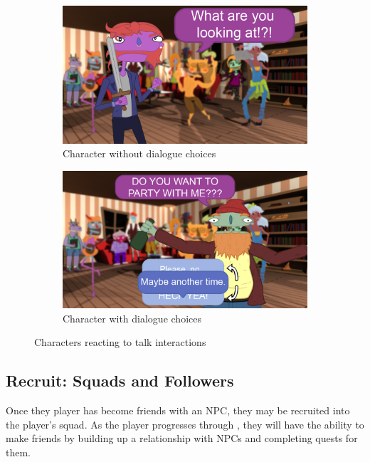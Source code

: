 \begin{figure}[H]
  \centering\begin{subfigure}{.45\textwidth}
    \centering
    \includegraphics[width=.9\linewidth]{images/UI_npc_nodialogue}
    \caption{Character without dialogue choices}
	\label{fig:speech_bubble}
  \end{subfigure}%
  \begin{subfigure}{.45\textwidth}
    \centering
    \includegraphics[width=.9\linewidth]{images/UI_npc_conversation}
    \caption{Character with dialogue choices}
	\label{fig:dialogue}
  \end{subfigure}%
  \caption{Characters reacting to talk interactions}
\end{figure}

\subsection{Recruit: Squads and Followers}
Once they player has become friends with an NPC, they may be recruited into the player's squad. As the player progresses through \ourgame{}, they will have the ability to make friends by building up a relationship with NPCs and completing quests for them.

